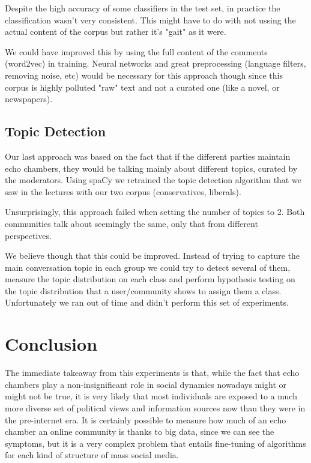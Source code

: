 \documentclass[11pt]{article}
\begin{document}
Despite the high accuracy of some classifiers in the test set, in practice the classification wasn't very consistent. This might have to do with not ussing the actual content of the corpus but rather it's "gait" as it were.

We could have improved this by using the full content of the comments (word2vec) in training. Neural networks and great preprocessing (language filters, removing noise, etc) would be necessary for this approach though since this corpus is highly polluted "raw" text and not a curated one (like a novel, or newspapers).

\subsection{Topic Detection}

Our last approach was based on the fact that if the different parties maintain echo chambers, they would be talking mainly about different topics, curated by the moderators. Using spaCy we retrained the topic detection algorithm that we saw in the lectures with our two corpus (conservatives, liberals).

Unsurprisingly, this approach failed when setting the number of topics to 2. Both communities talk about seemingly the same, only that from different perspectives.

We believe though that this could be improved. Instead of trying to capture the main conversation topic in each group we could try to detect several of them, measure the topic distribution on each class and perform hypothesis testing on the topic distribution that a user/community shows to assign them a class. Unfortunately we ran out of time and didn't perform this set of experiments.

\section{Conclusion}

The immediate takeaway from this experiments is that, while the fact that echo chambers play a non-insignificant role in social dynamics nowadays might or might not be true, it is very likely that most individuals are exposed to a much more diverse set of political views and information sources now than they were in the pre-internet era. It is certainly possible to measure how much of an echo chamber an online community is thanks to big data, since we can see the symptoms, but it is a very complex problem that entails fine-tuning of algorithms for each kind of structure of mass social media.
\end{document}
